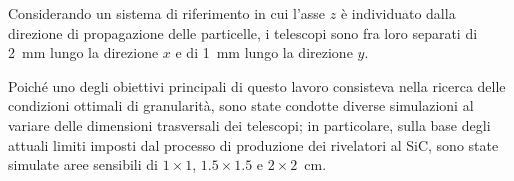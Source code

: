 Considerando un sistema di riferimento in cui l'asse $z$ è individuato dalla direzione di propagazione delle particelle, i telescopi sono fra loro separati di 2~mm lungo la direzione $x$ e di 1~mm lungo la direzione $y$.


%




Poiché uno degli obiettivi principali di questo lavoro consisteva nella ricerca delle condizioni ottimali di granularità, sono state condotte diverse simulazioni al variare delle dimensioni trasversali dei telescopi; in particolare, sulla base degli attuali limiti imposti dal processo di produzione dei rivelatori al SiC, sono state simulate aree sensibili di $1 \times 1$, $1.5 \times 1.5$ e $2 \times 2$~cm.





